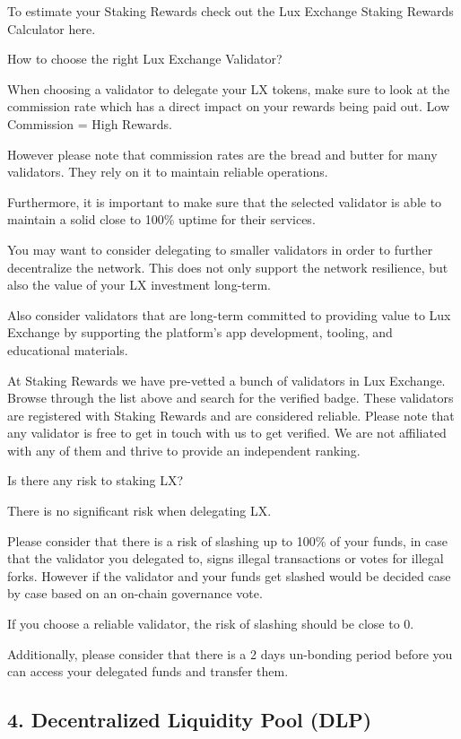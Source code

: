 \documentclass[11pt]{article}
\begin{document}
To estimate your Staking Rewards check out the Lux Exchange Staking Rewards Calculator here.


How to choose the right Lux Exchange Validator?


When choosing a validator to delegate your LX tokens, make sure to look at the commission rate which has a direct impact on your rewards being paid out. Low Commission = High Rewards.


However please note that commission rates are the bread and butter for many validators. They rely on it to maintain reliable operations.


Furthermore, it is important to make sure that the selected validator is able to maintain a solid close to 100\% uptime for their services.


You may want to consider delegating to smaller validators in order to further decentralize the network. This does not only support the network resilience, but also the value of your LX investment long-term.


Also consider validators that are long-term committed to providing value to Lux Exchange by supporting the platform's app development, tooling, and educational materials.


At Staking Rewards we have pre-vetted a bunch of validators in Lux Exchange. Browse through the list above and search for the verified badge. These validators are registered with Staking Rewards and are considered reliable. Please note that any validator is free to get in touch with us to get verified. We are not affiliated with any of them and thrive to provide an independent ranking.


Is there any risk to staking LX?


There is no significant risk when delegating LX.


Please consider that there is a risk of slashing up to 100\% of your funds, in case that the validator you delegated to, signs illegal transactions or votes for illegal forks. However if the validator and your funds get slashed would be decided case by case based on an on-chain governance vote.


If you choose a reliable validator, the risk of slashing should be close to 0.


Additionally, please consider that there is a 2 days un-bonding period before you can access your delegated funds and transfer them.


\subsection{4. Decentralized Liquidity Pool (DLP)}
\end{document}
